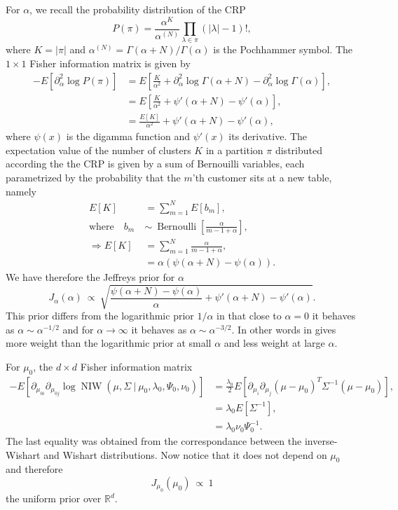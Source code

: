 \documentclass[11pt, oneside]{article}   	%
\DeclareMathOperator{\NIW}{NIW}
\begin{document}
For $\alpha$, we recall the probability distribution of the CRP
$$P(\pi) = \frac{\alpha^K}{\alpha^{(N)}}\prod_{\lambda\in\pi}(\vert\lambda\vert - 1)!,$$
where $K = \vert\pi\vert$ and $\alpha^{(N)} = \Gamma(\alpha + N)/\Gamma(\alpha)$ is the Pochhammer symbol.
The $1\times 1$ Fisher information matrix is given by
\begin{equation}\begin{split}
-E[\partial^2_\alpha \log P(\pi)] &= E\left[\frac{K}{\alpha^2} + \partial^2_\alpha \log\Gamma(\alpha + N) - \partial^2_\alpha\log\Gamma(\alpha)\right],\\
&= E\left[\frac{K}{\alpha^2} + \psi'(\alpha + N) - \psi'(\alpha)\right],\\
&= \frac{E[K]}{\alpha^2} + \psi'(\alpha + N) - \psi'(\alpha),
\end{split}\end{equation}
where $\psi(x)$ is the digamma function and $\psi'(x)$ its derivative. The expectation value of the number of clusters $K$ in a partition $\pi$ distributed according the the CRP is given by a sum of Bernouilli variables, each parametrized by the probability that the $m$'th customer sits at a new table, namely
\begin{equation}\begin{split}
E[K] &= \sum_{m = 1}^N E[b_m],\\
\text{where}\quad b_m~&\sim~\operatorname{Bernoulli}\left[\frac{\alpha}{m - 1 + \alpha}\right],\\
\Rightarrow E[K] &=  \sum_{m=1}^N \frac{\alpha}{m - 1 + \alpha},\\
&= \alpha(\psi(\alpha + N) - \psi(\alpha)).
\end{split}\end{equation}
We have therefore the Jeffreys prior for $\alpha$
\begin{equation}
J_\alpha(\alpha)~\propto~\sqrt{\frac{\psi(\alpha + N) - \psi(\alpha)}{\alpha} + \psi'(\alpha +N) - \psi'(\alpha)}.
\label{eq:jeffalpha}
\end{equation}
This prior differs from the logarithmic prior $1/\alpha$ in that close to $\alpha = 0$ it behaves as $\alpha\sim \alpha^{-1/2}$ and for $\alpha\rightarrow\infty$ it behaves as $\alpha\sim\alpha^{-3/2}$. In other words in gives more weight than the logarithmic prior at small $\alpha$ and less weight at large $\alpha$.

For $\mu_0$, the $d\times d$ Fisher information matrix
\begin{equation}\begin{split}
-E\left[\partial_{\mu_{0i}}\partial_{\mu_{0j}} \log \NIW(\mu,\Sigma~\vert~\mu_0,\lambda_0,\Psi_0,\nu_0)\right] &= \frac{\lambda_0}{2}E[\partial_{\mu_i}\partial_{\mu_j}(\mu - \mu_0)^T\Sigma^{-1}(\mu - \mu_0)],\\
&= \lambda_0 E[\Sigma^{-1}],\\
&= \lambda_0\nu_0\Psi_0^{-1}.
\end{split}\end{equation}
The last equality was obtained from the correspondance between the inverse-Wishart and Wishart distributions. Now notice that it does not depend on $\mu_0$ and therefore
$$J_{\mu_0}(\mu_0)~\propto~1$$
the uniform prior over $\mathbb{R}^d$.
\end{document}
